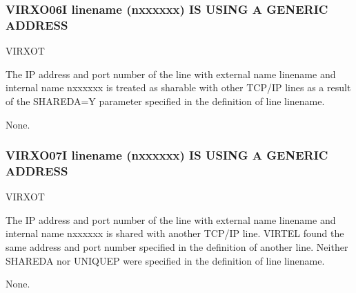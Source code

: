 \documentclass[letterpaper,10pt,english]{sphinxmanual}
\begin{document}
\subsubsection{VIRXO06I linename (n\sphinxhyphen{}xxxxxx) IS USING A GENERIC ADDRESS}
\label{\detokenize{messages:virxo06i-linename-n-xxxxxx-is-using-a-generic-address}}\begin{description}
\sphinxAtStartPar
VIRXOT

\sphinxAtStartPar
The IP address and port number of the line with external name linename and internal name n\sphinxhyphen{}xxxxxx is treated as sharable with other TCP/IP lines as a result of the SHAREDA=Y parameter specified in the definition of line linename.

\sphinxAtStartPar
None.

\end{description}


\subsubsection{VIRXO07I linename (n\sphinxhyphen{}xxxxxx) IS USING A GENERIC ADDRESS}
\label{\detokenize{messages:virxo07i-linename-n-xxxxxx-is-using-a-generic-address}}\begin{description}
\sphinxAtStartPar
VIRXOT

\sphinxAtStartPar
The IP address and port number of the line with external name linename and internal name n\sphinxhyphen{}xxxxxx is shared with another TCP/IP line. VIRTEL found the same address and port number specified in the definition of another line. Neither SHAREDA nor UNIQUEP were specified in the definition of line linename.

\sphinxAtStartPar
None.

\end{description}
\end{document}
